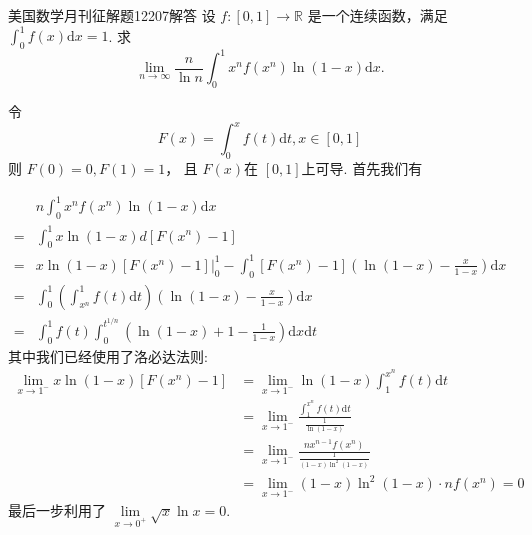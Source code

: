 \documentclass[UTF8,no-math,12pt,openany,table,dvipsnames,svgnames]{book}
\newcommand{\hei}{\CJKfamily{hei}}
\newenvironment{solve}{\par\indent{\hei 解}\hspace{1em}}{\par}
\begin{document}
\begin{MYBOX}[colbacktitle=blue]{美国数学月刊征解题12207解答}
设 $f:[0,1]\to\mathbb R$ 是一个连续函数，满足 $\int_0^1f(x)\mathrm dx=1$. 求
\[
  \lim_{n\to\infty}\frac n{\ln n}\int_0^1x^nf(x^n)\ln(1-x)\mathrm dx.
\]
\tcblower
\begin{solve}
令
\[
  F(x) = \int_0^xf(t)\mathrm dt,x\in[0,1]
\]
则 $F(0)=0,F(1)=1$， 且 $F(x)$在 $[0,1]$上可导. 首先我们有

\begin{align*}
     & n\int_0^1x^nf(x^n)\ln(1-x)\mathrm dx \\
  = {}& \int_0^1x\ln(1-x) d[F(x^n)-1]\\
  = {}& x\ln(1-x)[F(x^n)-1]\Big|_0^1 - \int_0^1[F(x^n)-1]
      \left( \ln(1-x) - \frac x{1-x} \right)\mathrm dx \\
  = {}& \int_0^1\left(\int_{x^n}^1f(t)\mathrm dt\right)\left( \ln(1-x) - \frac x{1-x} \right)\mathrm dx \\
  = {}& \int_0^1 f(t)  \int_0^{t^{1/n}} \left(\ln(1-x) + 1 - \frac1{1-x} \right)\mathrm dx \mathrm dt
\end{align*}
其中我们已经使用了洛必达法则:
\begin{align*}
  \lim _{x\to 1^-} x\ln(1-x)[F(x^n)-1] & = \lim_{x\to1^-}
   \ln(1-x) \int_1^{x^n} f(t)\mathrm dt \\
   & = \lim_{x\to1^-} \frac{\int_1^{x^n} f(t)\mathrm dt }
       { \frac1{\ln(1-x)} } \\
   & = \lim_{x\to 1^-} \frac{ nx^{n-1} f(x^n) }
            { \frac1{(1-x)\ln^2(1-x)} } \\
   & = \lim_{x\to 1^-}(1-x)\ln^2(1-x) \cdot n f(x^n) = 0
\end{align*}
最后一步利用了
$\lim\limits_{x\to0^+}\sqrt x\ln x = 0$.


\end{solve}
\end{MYBOX}
\end{document}
